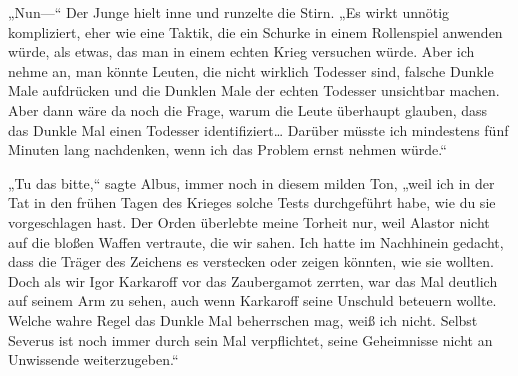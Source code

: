 „Nun—“ Der Junge hielt inne und runzelte die Stirn. „Es wirkt unnötig kompliziert, eher wie eine Taktik, die ein Schurke in einem Rollenspiel anwenden würde, als etwas, das man in einem echten Krieg versuchen würde. Aber ich nehme an, man könnte Leuten, die nicht wirklich Todesser sind, falsche Dunkle Male aufdrücken und die Dunklen Male der echten Todesser unsichtbar machen. Aber dann wäre da noch die Frage, warum die Leute überhaupt glauben, dass das Dunkle Mal einen Todesser identifiziert… Darüber müsste ich mindestens fünf Minuten lang nachdenken, wenn ich das Problem ernst nehmen würde.“

„Tu das bitte,“ sagte Albus, immer noch in diesem milden Ton, „weil ich in der Tat in den frühen Tagen des Krieges solche Tests durchgeführt habe, wie du sie vorgeschlagen hast. Der Orden überlebte meine Torheit nur, weil Alastor nicht auf die bloßen Waffen vertraute, die wir sahen. Ich hatte im Nachhinein gedacht, dass die Träger des Zeichens es verstecken oder zeigen könnten, wie sie wollten. Doch als wir Igor Karkaroff vor das Zaubergamot zerrten, war das Mal deutlich auf seinem Arm zu sehen, auch wenn Karkaroff seine Unschuld beteuern wollte. Welche wahre Regel das Dunkle Mal beherrschen mag, weiß ich nicht. Selbst Severus ist noch immer durch sein Mal verpflichtet, seine Geheimnisse nicht an Unwissende weiterzugeben.“

